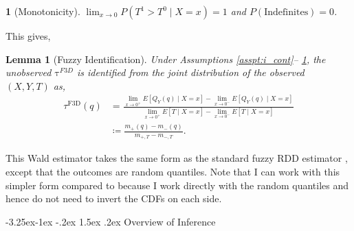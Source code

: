 \documentclass[12pt]{article}
\makeatletter
\renewcommand\subsection{\@startsection{subsection}{2}{\z@}%
  {-3.25ex\@plus -1ex \@minus -.2ex}%
  {1.5ex \@plus .2ex}%
  {\itshape\large\center}} %
\newtheorem{lemma}{Lemma}
\newtheorem{assumpI}{}
\makeatother
\begin{document}
\begin{assumpI}[Monotonicity] \label{asspt:i_monotonicity}
$\lim_{x \to 0} P(T^1 > T^0 \mid X=x) = 1$ and $P(\mathrm{Indefinites}) = 0$.
\end{assumpI}
This gives,
\begin{lemma}[Fuzzy Identification] \label{lemma:fuzzy_identification}
Under Assumptions \ref{asspt:i_cont}-- \ref{asspt:i_monotonicity}, the unobserved $\mathrm{\tau}^{F3D}$ is identified from the joint distribution of the observed $(X,Y,T)$ as,
\begin{align} \tau^{\mathrm{F3D}}(q) & =\frac{\lim _{x \rightarrow 0^{+}} E\left[Q_Y(q) \mid X=x\right]-\lim _{x \rightarrow 0^{-}} E\left[Q_Y(q) \mid X=x\right]}{
\lim _{x \rightarrow 0^{+}} E\left[T \mid X=x\right]-\lim _{x \rightarrow 0^{-}} E\left[T \mid X=x\right]
} \\ & \coloneqq \frac{m_{+}(q)-m_{-}(q)}{
m_{+,T}- m_{-,T} \nonumber
}. \end{align}
\end{lemma}
This Wald estimator takes the same form as the standard fuzzy RDD estimator \citep{hahn2001identification}, except that the outcomes are random quantiles. Note that I can work with this simpler form compared to \citet[Eq. 2-3]{frandsen2012quantile} because I work directly with the random quantiles and hence do not need to invert the CDFs on each side.


\subsection{Overview of Inference} \label{sec:inference_overview}
\end{document}
